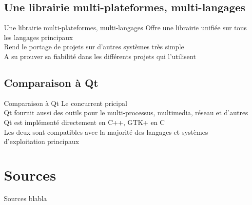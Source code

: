 \documentclass{beamer}
\begin{document}
  \subsection{Une librairie multi-plateformes, multi-langages}
  \begin{frame}{Une librairie multi-plateformes, multi-langages}
    Offre une librairie unifiée sur tous les langages principaux\\
    Rend le portage de projets sur d'autres systèmes très simple\\
    A su prouver sa fiabilité dans les différents projets qui l'utilisent
  \end{frame}
  \subsection{Comparaison à Qt}
  \begin{frame}{Comparaison à Qt}
    Le concurrent pricipal\\
    Qt fournit aussi des outils pour le multi-processus, multimedia, réseau et d'autres\\
    Qt est implémenté directement en C++, GTK+ en C\\
    Les deux sont compatibles avec la majorité des langages et systèmes d'exploitation principaux
  \end{frame}

  \section{Sources}
  \begin{frame}{Sources}
  blabla
  \end{frame}
\end{document}
